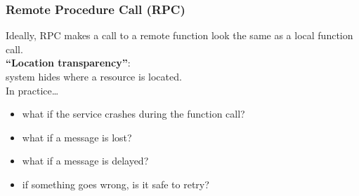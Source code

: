 \begin{frame}
    \label{s:rpc-problems}
    \frametitle{Remote Procedure Call (RPC)}
    Ideally, RPC makes a call to a remote function look the same as a local function call.\\[1em]
    \textbf{``Location transparency''}:\\ system hides where a resource is located.\\[1em]\pause
    In practice\dots
    \begin{itemize}
        \item what if the service crashes during the function call?
        \item what if a message is lost?
        \item what if a message is delayed?
        \item if something goes wrong, is it safe to retry?
    \end{itemize}
\end{frame}

